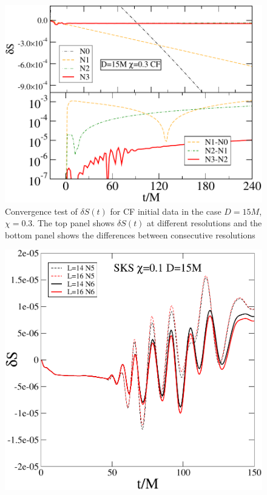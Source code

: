 \begin{figure}
  \includegraphics[width=0.95\columnwidth]{chap5/CFSConvergence1}
  \caption{Convergence test of $\delta S(t)$ for CF initial data in the case
    $D=15M$, $\chi=0.3$. The top panel shows $\delta S(t)$ at different
    resolutions and the bottom panel shows the differences between
    consecutive resolutions}
  \label{fig:CFSConvergence1}
\end{figure}

\begin{figure}
  \includegraphics[width=0.95\columnwidth]{chap5/dS_SKS_S1}
\end{figure}

